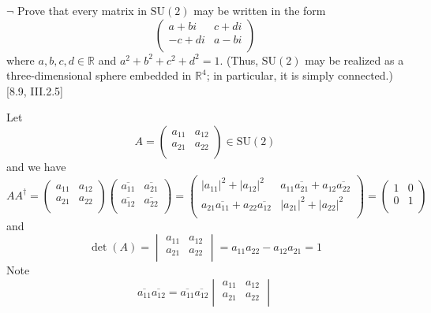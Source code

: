 \documentclass[12pt,letterpaper,boxed]{hmcpset}
\newcommand{\R}{\mathbb{R}}
\begin{document}
\hypertarget{Exercise II.6.3}{}
\begin{problem}[6.3]
$\neg$ Prove that every matrix in $\mathrm{SU}(2)$ may be written in the form
\[
\begin{pmatrix}
a + bi& c + di\\
-c + di& a-bi\\
\end{pmatrix}
\]
where $a, b, c, d \in \R$ and $a^2 + b^2 + c^2 + d^2 = 1$. (Thus, $\mathrm{SU}(2)$ may be realized as a three-dimensional sphere embedded in $\R^4$; in particular, it is simply connected.)[8.9, III.2.5]
\end{problem}
\begin{solution}
Let
	\[
	A=
	\begin{pmatrix}
	a_{11}& a_{12}\\
    a_{21}& a_{22}\\
	\end{pmatrix}
	\in\mathrm{SU}(2)
	\]
and we have
\[
AA^\dag=
\begin{pmatrix}
a_{11}& a_{12}\\
a_{21}& a_{22}\\
\end{pmatrix}
\begin{pmatrix}
\overline{a_{11}}& \overline{a_{21}}\\
\overline{a_{12}}& \overline{a_{22}}\\
\end{pmatrix}
=
\begin{pmatrix}
|a_{11}|^2+|a_{12}|^2& a_{11}\overline{a_{21}}+a_{12}\overline{a_{22}}\\
 a_{21}\overline{a_{11}}+a_{22}\overline{a_{12}}& |a_{21}|^2+|a_{22}|^2\\
\end{pmatrix}
=
\begin{pmatrix}
1& 0\\
0& 1\\
\end{pmatrix}
\]
and
\[
\det(A)=
\begin{vmatrix}
a_{11}& a_{12}\\
a_{21}& a_{22}\\
\end{vmatrix}=a_{11}a_{22}-a_{12}a_{21}=1
\]
Note 
\[
\overline{a_{11}}\overline{a_{12}}=\overline{a_{11}}\overline{a_{12}}
\begin{vmatrix}
a_{11}& a_{12}\\
a_{21}& a_{22}\\
\end{vmatrix}
\]
\end{solution}
\end{document}
